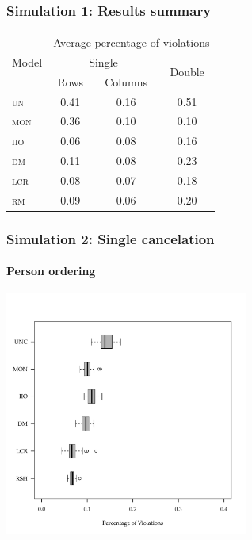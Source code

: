 \documentclass[10pt,serif,professionalfont]{beamer}
\begin{document}
\begin{frame}
    \frametitle{Simulation 1: Results summary}
    
    \begin{center}
    \begin{tabular}{lccc}
    \toprule
     \multirow{3}{*}{Model} & \multicolumn{3}{c}{Average percentage of violations} \\ \cmidrule(lr){2-4}
                & \multicolumn{2}{c}{Single} & \multirow{2}{*}{Double} \\ \cmidrule(lr){2-3}
                  & Rows       & Columns    &            \\
    \midrule
     \textsc{un}  & 0.41 & 0.16 & 0.51 \\
     \textsc{mon} & 0.36 & 0.10 & 0.10 \\
     \textsc{iio} & 0.06 & 0.08 & 0.16 \\
     \textsc{dm}  & 0.11 & 0.08 & 0.23 \\
     \textsc{lcr} & 0.08 & 0.07 & 0.18 \\
     \textsc{rm}  & 0.09 & 0.06 & 0.20 \\
    \bottomrule
    \end{tabular}
    \end{center}



\end{frame}

\begin{frame}
    \frametitle{Simulation 2: Single cancelation}
        \framesubtitle{Person ordering}

    \centering \includegraphics[width=0.6\textwidth]{./figs/violations_columns_weighted.pdf}

\end{frame}
\end{document}
